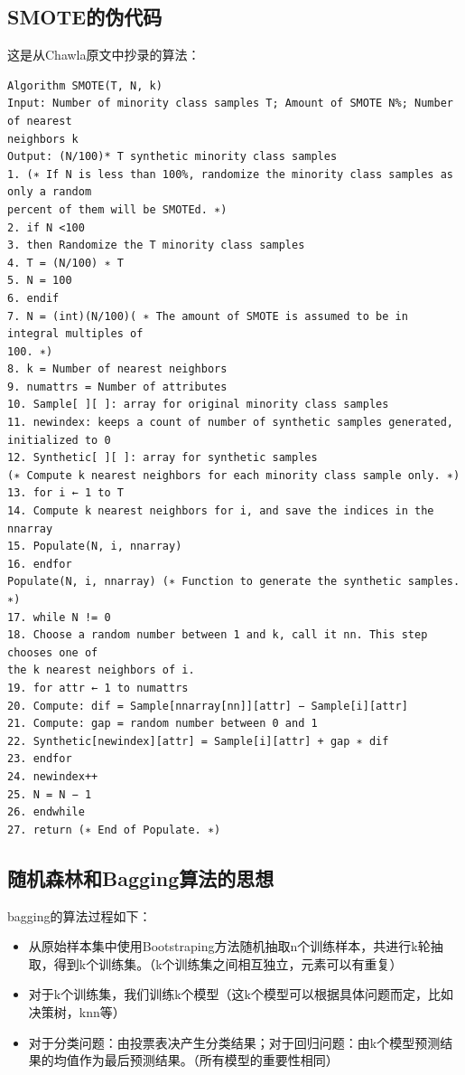 \documentclass{article}
\begin{document}
\subsection{SMOTE的伪代码} %
\label{sub:smote的伪代码}
这是从Chawla\cite{Chawla2002SMOTE}原文中抄录的算法：
\scriptsize
\begin{lstlisting}
Algorithm SMOTE(T, N, k)
Input: Number of minority class samples T; Amount of SMOTE N%; Number of nearest
neighbors k
Output: (N/100)* T synthetic minority class samples
1. (∗ If N is less than 100%, randomize the minority class samples as only a random
percent of them will be SMOTEd. ∗)
2. if N <100
3. then Randomize the T minority class samples
4. T = (N/100) ∗ T
5. N = 100
6. endif
7. N = (int)(N/100)( ∗ The amount of SMOTE is assumed to be in integral multiples of
100. ∗)
8. k = Number of nearest neighbors
9. numattrs = Number of attributes
10. Sample[ ][ ]: array for original minority class samples
11. newindex: keeps a count of number of synthetic samples generated, initialized to 0
12. Synthetic[ ][ ]: array for synthetic samples
(∗ Compute k nearest neighbors for each minority class sample only. ∗)
13. for i ← 1 to T
14. Compute k nearest neighbors for i, and save the indices in the nnarray
15. Populate(N, i, nnarray)
16. endfor
Populate(N, i, nnarray) (∗ Function to generate the synthetic samples. ∗)
17. while N != 0
18. Choose a random number between 1 and k, call it nn. This step chooses one of
the k nearest neighbors of i.
19. for attr ← 1 to numattrs
20. Compute: dif = Sample[nnarray[nn]][attr] − Sample[i][attr]
21. Compute: gap = random number between 0 and 1
22. Synthetic[newindex][attr] = Sample[i][attr] + gap ∗ dif
23. endfor
24. newindex++
25. N = N − 1
26. endwhile
27. return (∗ End of Populate. ∗)   
\end{lstlisting}

\subsection{随机森林和Bagging算法的思想} %
\label{sub:bagging算法的思想}
\normalsize

\par bagging的算法过程如下： 
\begin{itemize}
    \item 从原始样本集中使用Bootstraping方法随机抽取n个训练样本，共进行k轮抽取，得到k个训练集。（k个训练集之间相互独立，元素可以有重复）
    \item 对于k个训练集，我们训练k个模型（这k个模型可以根据具体问题而定，比如决策树，knn等）
    \item 对于分类问题：由投票表决产生分类结果；对于回归问题：由k个模型预测结果的均值作为最后预测结果。（所有模型的重要性相同）
\end{itemize}
\end{document}
